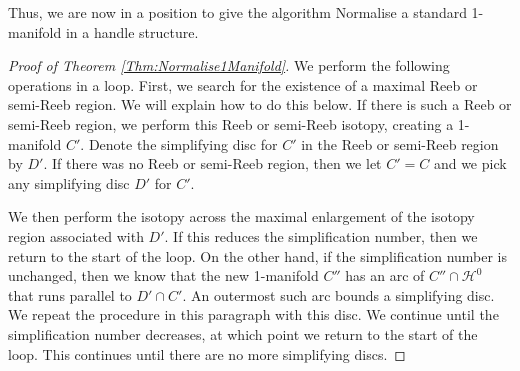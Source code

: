 \documentclass[oneside]{amsart}
\numberwithin{equation}{section}
\theoremstyle{plain}
\theoremstyle{definition}
\newcommand{\calH}{\mathcal{H}}
\begin{document}
Thus, we are now in a position to give the algorithm {\sc Normalise a standard 1-manifold in a handle structure}.

\begin{proof}[Proof of Theorem \ref{Thm:Normalise1Manifold}]
We perform the following operations in a loop. First, we search for the existence of a maximal Reeb or semi-Reeb region. We will explain how to do this below. If there is such a Reeb or semi-Reeb region, we perform this Reeb or semi-Reeb isotopy, creating a 1-manifold $C'$. Denote the simplifying disc for $C'$ in the Reeb or semi-Reeb region by $D'$. 
If there was no Reeb or semi-Reeb region, then we let $C' = C$ and we pick any simplifying disc $D'$ for $C'$. 

We then perform the isotopy across the maximal enlargement of the isotopy region associated with $D'$. If this reduces the simplification number, then we return to the start of the loop. On the other hand, if the simplification number is unchanged, then we know that the new 1-manifold $C''$ has an arc of $C'' \cap \calH^0$ that runs parallel to $D' \cap C'$. An outermost such arc bounds a simplifying disc. We repeat the procedure in this paragraph with this disc. We continue until the simplification number decreases, at which point we return to the start of the loop. This continues until there are no more simplifying discs.


\end{proof}
\end{document}
